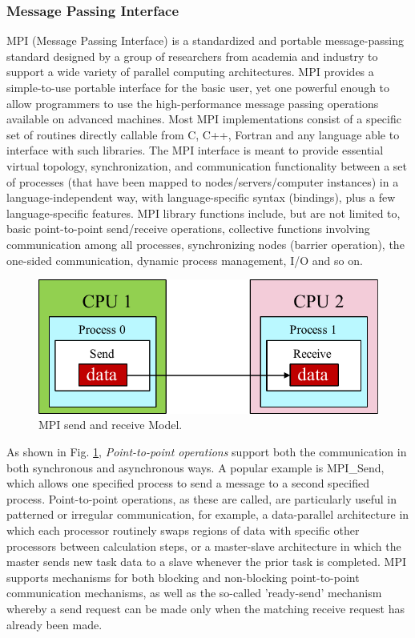 \subsubsection{Message Passing Interface}

MPI (Message Passing Interface) \cite{gropp1999using} is a standardized and portable message-passing standard designed by a group of researchers from academia and industry to support a wide variety of parallel computing architectures. MPI provides a simple-to-use portable interface for the basic user, yet one powerful enough to allow programmers to use the high-performance message passing operations available on advanced machines. Most MPI implementations consist of a specific set of routines directly callable from C, C++, Fortran and any language able to interface with such libraries. The MPI interface is meant to provide essential virtual topology, synchronization, and communication functionality between a set of processes (that have been mapped to nodes/servers/computer instances) in a language-independent way, with language-specific syntax (bindings), plus a few language-specific features. MPI library functions include, but are not limited to, basic point-to-point send/receive operations, collective functions involving communication among all processes, synchronizing nodes (barrier operation), the one-sided communication, dynamic process management, I/O and so on. 

\begin{figure}[htbp]
	\centering
	\includegraphics[width=5.4in]{fig/point-point.pdf}
	\caption{MPI send and receive Model.}
	\label{mpi_model}
\end{figure}

As shown in Fig. \ref{mpi_model}, \textit{Point-to-point operations} support both the communication in both synchronous and asynchronous ways.  A popular example is MPI\_Send, which allows one specified process to send a message to a second specified process. Point-to-point operations, as these are called, are particularly useful in patterned or irregular communication, for example, a data-parallel architecture in which each processor routinely swaps regions of data with specific other processors between calculation steps, or a master-slave architecture in which the master sends new task data to a slave whenever the prior task is completed. MPI supports mechanisms for both blocking and non-blocking point-to-point communication mechanisms, as well as the so-called 'ready-send' mechanism whereby a send request can be made only when the matching receive request has already been made.

